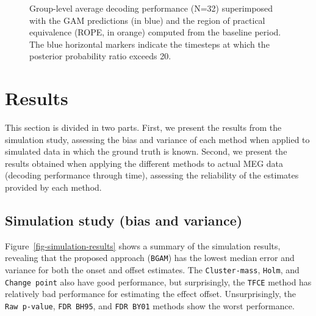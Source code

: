 \documentclass[
  doc,
  floatsintext,
  longtable,
  a4paper,
  nolmodern,
  notxfonts,
  notimes,
  colorlinks=true,linkcolor=blue,citecolor=blue,urlcolor=blue]{apa7}
\begin{document}
\begin{figure}[!htb]

\caption{\label{fig-decoding-data}Group-level average decoding
performance (N=32) superimposed with the GAM predictions (in blue) and
the region of practical equivalence (ROPE, in orange) computed from the
baseline period. The blue horizontal markers indicate the timesteps at
which the posterior probability ratio exceeds 20.}


\end{figure}%

\newpage

\section{Results}\label{results}

This section is divided in two parts. First, we present the results from
the simulation study, assessing the bias and variance of each method
when applied to simulated data in which the ground truth is known.
Second, we present the results obtained when applying the different
methods to actual MEG data (decoding performance through time),
assessing the reliability of the estimates provided by each method.

\subsection{Simulation study (bias and
variance)}\label{simulation-study-bias-and-variance}

Figure~\ref{fig-simulation-results} shows a summary of the simulation
results, revealing that the proposed approach (\texttt{BGAM}) has the
lowest median error and variance for both the onset and offset
estimates. The \texttt{Cluster-mass}, \texttt{Holm}, and
\texttt{Change\ point} also have good performance, but surprisingly, the
\texttt{TFCE} method has relatively bad performance for estimating the
effect offset. Unsurprisingly, the \texttt{Raw\ p-value},
\texttt{FDR\ BH95}, and \texttt{FDR\ BY01} methods show the worst
performance.
\end{document}
